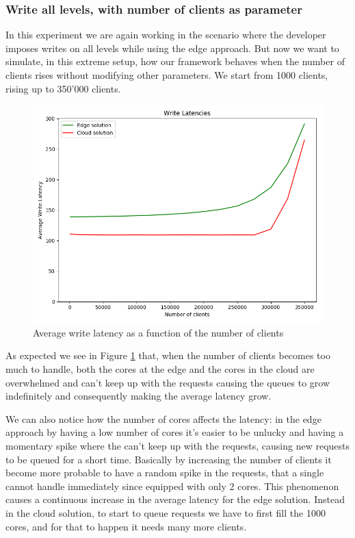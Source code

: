\subsubsection{Write all levels, with number of clients as parameter}
In this experiment we are again working in the scenario where the developer imposes writes on all levels while using the edge approach. But now we want to simulate, in this extreme setup, how our framework behaves when the number of clients rises without modifying other parameters.
We start from 1000 clients, rising up to 350'000 clients.

\begin{figure}[H]
    \centering
    \includegraphics[width=0.86\linewidth]{Figures/Evaluation/write-all-clients-latency.png}
    \caption{Average write latency as a function of the number of clients}
    \label{fig:/write-all-clients-latency}
\end{figure}

As expected we see in Figure \ref{fig:/write-all-clients-latency} that, when the number of clients becomes too much to handle, both the cores at the edge and the cores in the cloud are overwhelmed and can't keep up with the requests causing the queues to grow indefinitely and consequently making the average latency grow.

We can also notice how the number of cores affects the latency: in the edge approach by having a low number of cores it's easier to be unlucky and having a momentary spike where the  can't keep up with the requests, causing new requests to be queued for a short time. Basically by increasing the number of clients it become more probable to have a random spike in the requests, that a single  cannot handle immediately since equipped with only 2 cores. This phenomenon causes a continuous increase in the average latency for the edge solution.
Instead in the cloud solution, to start to queue requests we have to first fill the 1000 cores, and for that to happen it needs many more clients.

